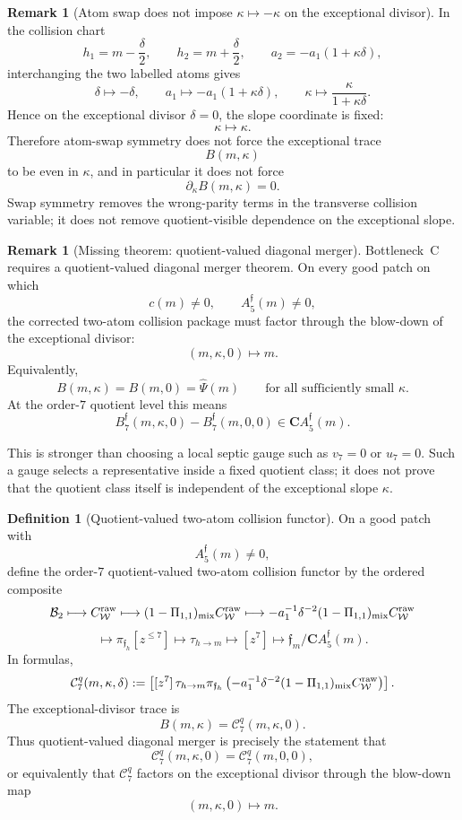 \documentclass[11pt,a4paper]{amsart}
\theoremstyle{plain}
\theoremstyle{definition}
\newtheorem{definition}[theorem]{Definition}
\newtheorem{remark}[theorem]{Remark}
\begin{document}
\begin{remark}[Atom swap does not impose \(\kappa\mapsto-\kappa\) on the exceptional divisor]
\label{rem:atom-swap-does-not-kill-kappa-slope}
In the collision chart
\[
h_1=m-\frac{\delta}{2},
\qquad
h_2=m+\frac{\delta}{2},
\qquad
a_2=-a_1(1+\kappa\delta),
\]
interchanging the two labelled atoms gives
\[
\delta\longmapsto-\delta,
\qquad
a_1\longmapsto -a_1(1+\kappa\delta),
\qquad
\kappa\longmapsto \frac{\kappa}{1+\kappa\delta}.
\]
Hence on the exceptional divisor \(\delta=0\), the slope coordinate is fixed:
\[
\kappa\longmapsto\kappa.
\]
Therefore atom-swap symmetry does not force the exceptional trace
\[
B(m,\kappa)
\]
to be even in \(\kappa\), and in particular it does not force
\[
\partial_\kappa B(m,\kappa)=0.
\]
Swap symmetry removes the wrong-parity terms in the transverse collision
variable; it does not remove quotient-visible dependence on the exceptional
slope.
\end{remark}

\begin{remark}[Missing theorem: quotient-valued diagonal merger]
\label{rem:missing-quotient-valued-diagonal-merger}
Bottleneck~C requires a quotient-valued diagonal merger theorem.  On every
good patch on which
\[
c(m)\ne0,
\qquad
A_5^{\mathfrak f}(m)\ne0,
\]
the corrected two-atom collision package must factor through the blow-down of
the exceptional divisor:
\[
(m,\kappa,0)\longmapsto m.
\]
Equivalently,
\[
B(m,\kappa)
=
B(m,0)
=
\widehat\Psi(m)
\qquad
\text{for all sufficiently small }\kappa.
\]
At the order-\(7\) quotient level this means
\[
B_7^{\mathfrak f}(m,\kappa,0)
-
B_7^{\mathfrak f}(m,0,0)
\in
\mathbf C A_5^{\mathfrak f}(m).
\]

This is stronger than choosing a local septic gauge such as \(v_7=0\) or
\(u_7=0\).  Such a gauge selects a representative inside a fixed quotient
class; it does not prove that the quotient class itself is independent of the
exceptional slope \(\kappa\).
\end{remark}

\begin{definition}[Quotient-valued two-atom collision functor]
\label{def:quotient-valued-two-atom-collision-functor}
On a good patch with
\[
A_5^{\mathfrak f}(m)\ne0,
\]
define the order-\(7\) quotient-valued two-atom collision functor by the
ordered composite
\[
\mathcal B_2
\longmapsto
C_{\mathcal W}^{\rm raw}
\longmapsto
(1-\Pi_{1,1})_{\rm mix}C_{\mathcal W}^{\rm raw}
\longmapsto
-a_1^{-1}\delta^{-2}
(1-\Pi_{1,1})_{\rm mix}C_{\mathcal W}^{\rm raw}
\]
\[
\longmapsto
\pi_{\mathfrak f_h}[z^{\le7}]
\longmapsto
\tau_{h\to m}
\longmapsto
[z^7]
\longmapsto
\mathfrak f_m/\mathbf C A_5^{\mathfrak f}(m).
\]
In formulas,
\[
\mathcal C_7^q(m,\kappa,\delta)
:=
\left[
[z^7]\,
\tau_{h\to m}
\pi_{\mathfrak f_h}
\left(
-a_1^{-1}\delta^{-2}
(1-\Pi_{1,1})_{\rm mix}
C_{\mathcal W}^{\rm raw}
\right)
\right].
\]
The exceptional-divisor trace is
\[
B(m,\kappa)=\mathcal C_7^q(m,\kappa,0).
\]
Thus quotient-valued diagonal merger is precisely the statement that
\[
\mathcal C_7^q(m,\kappa,0)
=
\mathcal C_7^q(m,0,0),
\]
or equivalently that \(\mathcal C_7^q\) factors on the exceptional divisor
through the blow-down map
\[
(m,\kappa,0)\longmapsto m.
\]
\end{definition}
\end{document}
